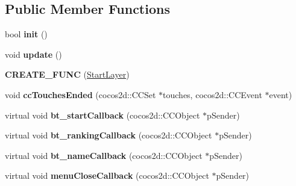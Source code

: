 \subsection*{Public Member Functions}
\begin{DoxyCompactItemize}
\item 
\hypertarget{class_start_layer_ac37d0730c548e206943d8a5291335b02}{bool {\bfseries init} ()}\label{class_start_layer_ac37d0730c548e206943d8a5291335b02}

\item 
\hypertarget{class_start_layer_a1e2c128e2a43cca98bc684274f79b34a}{void {\bfseries update} ()}\label{class_start_layer_a1e2c128e2a43cca98bc684274f79b34a}

\item 
\hypertarget{class_start_layer_a845c24866529d618f7bd4b59b7bfcccb}{{\bfseries C\-R\-E\-A\-T\-E\-\_\-\-F\-U\-N\-C} (\hyperlink{class_start_layer}{Start\-Layer})}\label{class_start_layer_a845c24866529d618f7bd4b59b7bfcccb}

\item 
\hypertarget{class_start_layer_a113303483b234ab277e84c0aa3ab6798}{void {\bfseries cc\-Touches\-Ended} (cocos2d\-::\-C\-C\-Set $\ast$touches, cocos2d\-::\-C\-C\-Event $\ast$event)}\label{class_start_layer_a113303483b234ab277e84c0aa3ab6798}

\item 
\hypertarget{class_start_layer_adcaf7188f5937edc786ccf6981bf0fa5}{virtual void {\bfseries bt\-\_\-start\-Callback} (cocos2d\-::\-C\-C\-Object $\ast$p\-Sender)}\label{class_start_layer_adcaf7188f5937edc786ccf6981bf0fa5}

\item 
\hypertarget{class_start_layer_a03f67df2b637d8ad4ae9ef0048d258b8}{virtual void {\bfseries bt\-\_\-ranking\-Callback} (cocos2d\-::\-C\-C\-Object $\ast$p\-Sender)}\label{class_start_layer_a03f67df2b637d8ad4ae9ef0048d258b8}

\item 
\hypertarget{class_start_layer_ae9d6d4b3be5cda330ea0568efa0f65fa}{virtual void {\bfseries bt\-\_\-name\-Callback} (cocos2d\-::\-C\-C\-Object $\ast$p\-Sender)}\label{class_start_layer_ae9d6d4b3be5cda330ea0568efa0f65fa}

\item 
\hypertarget{class_start_layer_acd4b5a7c503c9ec84fe354fc0a640fbe}{virtual void {\bfseries menu\-Close\-Callback} (cocos2d\-::\-C\-C\-Object $\ast$p\-Sender)}\label{class_start_layer_acd4b5a7c503c9ec84fe354fc0a640fbe}


\end{DoxyCompactItemize}

